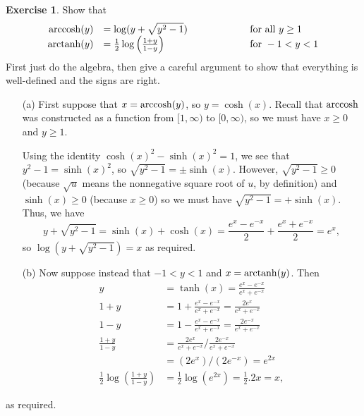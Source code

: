 \documentclass[a4paper]{book}
\theoremstyle{definition}
\newtheorem{exercise}[theorem]{Exercise}
\renewenvironment{solution}{\SolutionInline}{\endSolutionInline}
\begin{document}
\begin{exercise}
 Show that
 \[ \begin{array}{rlll}
  \operatorname{arccosh}(y) &= \log(y+\sqrt{y^2-1})
              & \hspace{4em} & \text{ for all } y\geq 1 \\
  \operatorname{arctanh}(y) &= \frac{1}{2}\log\left(\frac{1+y}{1-y}\right)
              & \hspace{4em} & \text{ for } -1<y<1
 \end{array} \]
 First just do the algebra, then give a careful argument to show that
 everything is well-defined and the signs are right.
\end{exercise}
\begin{solution}
 \begin{itemize}
 \item[(a)] First suppose that $x=\operatorname{arccosh}(y)$, so $y=\cosh(x)$.
  Recall that $\operatorname{arccosh}$ was constructed as a function from
  $[1,\infty)$ to $[0,\infty)$, so we must have $x\geq 0$ and
  $y\geq 1$.

  Using the identity $\cosh(x)^2-\sinh(x)^2=1$, we see that
  $y^2-1=\sinh(x)^2$, so $\sqrt{y^2-1}=\pm\sinh(x)$.  However,
  $\sqrt{y^2-1}\geq 0$ (because $\sqrt{u}$ means the nonnegative
  square root of $u$, by definition) and $\sinh(x)\geq 0$ (because
  $x\geq 0$) so we must have $\sqrt{y^2-1}=+\sinh(x)$.  Thus, we have
  \[ y + \sqrt{y^2-1} = \sinh(x)+\cosh(x) = 
      \frac{e^x-e^{-x}}{2}+\frac{e^x+e^{-x}}{2} = e^x, \]
  so $\log(y + \sqrt{y^2-1})=x$ as required.
 \item[(b)] Now suppose instead that $-1<y<1$ and $x=\operatorname{arctanh}(y)$.  Then
   \begin{align*}
    y &= \tanh(x) = \frac{e^x-e^{-x}}{e^x+e^{-x}} \\
    1+y &= 1 + \frac{e^x-e^{-x}}{e^x+e^{-x}} = \frac{2e^x}{e^x+e^{-x}} \\
    1-y &= 1 - \frac{e^x-e^{-x}}{e^x+e^{-x}} = \frac{2e^{-x}}{e^x+e^{-x}} \\
    \frac{1+y}{1-y} &= \frac{2e^x}{e^x+e^{-x}} / \frac{2e^{-x}}{e^x+e^{-x}} \\
                    &= (2e^x)/(2e^{-x}) = e^{2x} \\
    \frac{1}{2}\log\left(\frac{1+y}{1-y}\right) &=
      \frac{1}{2} \log(e^{2x}) = \frac{1}{2}.2x = x,
   \end{align*}
 \end{itemize}
 as required.
\end{solution}
\end{document}
